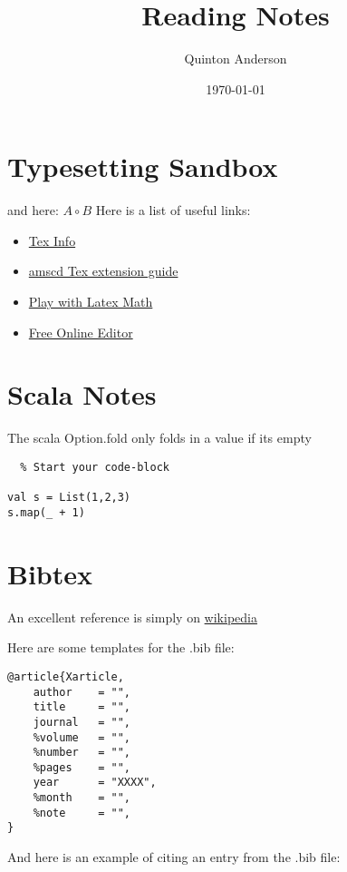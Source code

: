 \documentclass[11pt]{article}
\begin{document}
\title{Reading Notes}
\author{Quinton Anderson}
\date{\today}
\maketitle

\section{Typesetting Sandbox}

and here: $ A \circ B $ 
Here is a list of useful links:
\begin{itemize}

  \item \href{http://docs.mathjax.org/en/latest/tex.html}{Tex Info}
  \item \href{http://www.jmilne.org/not/Mamscd.pdf}{amscd Tex extension guide}
  \item \href{https://latex.codecogs.com/}{Play with Latex Math}
  \item \href{http://www.sciweavers.org/free-online-latex-equation-editor}{Free Online Editor}

\end{itemize}


\section{Scala Notes}

The scala Option.fold only folds in a value if its empty

\lstset{language=Scala} 
\begin{lstlisting}  % Start your code-block

val s = List(1,2,3)
s.map(_ + 1)

\end{lstlisting}

\section{Bibtex}

An excellent reference is simply on \href{http://en.wikibooks.org/wiki/LaTeX/Bibliography_Management}{wikipedia}

Here are some templates for the .bib file: 

\begin{lstlisting}	
@article{Xarticle,
    author    = "",
    title     = "",
    journal   = "",
    %volume   = "",
    %number   = "",
    %pages    = "",
    year      = "XXXX",
    %month    = "",
    %note     = "",
}
\end{lstlisting}

And here is an example of citing an entry from the .bib file:  \cite{greenwade93}



\end{document}
